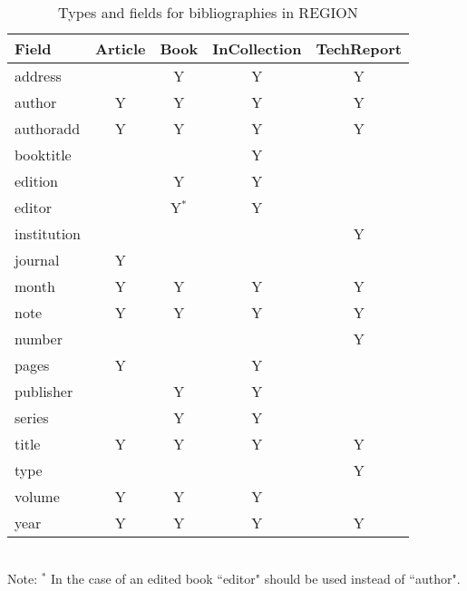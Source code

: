 \documentclass[a4paper,twoside]{article}
\begin{document}
\begin{table}
\centering
\caption{Types and fields for bibliographies in REGION}
\label{tab:6}
\begin{tabular}{||l|c|c|c|c||}
\hline
  {\bf Field} \hspace{13mm} & \hspace{5mm} {\bf Article} \hspace{5mm} & \hspace{5mm} {\bf Book} \hspace{5mm} & {\bf InCollection} & {\bf TechReport}  \\ \hline
  address      &         &  Y   &    Y         &   Y         \\ \hline
  author       &    Y    &  Y   &    Y         &   Y         \\ \hline
  authoradd    &    Y    &  Y   &    Y         &   Y         \\ \hline 
  booktitle    &         &      &    Y         &             \\ \hline
  edition      &         &  Y   &    Y         &             \\ \hline	
  editor       &         &  Y$^*$   &    Y         &             \\ \hline
  institution  &         &      &              &   Y         \\ \hline
  journal      &    Y    &      &              &             \\ \hline
  month        &    Y    &  Y   &    Y         &   Y         \\ \hline
  note         &    Y    &  Y   &    Y         &   Y         \\ \hline
  number       &         &      &              &   Y         \\ \hline	
  pages        &    Y    &      &    Y         &             \\ \hline
  publisher    &         &  Y   &    Y         &             \\ \hline	
  series       &         &  Y   &    Y         &             \\ \hline
  title        &    Y    &  Y   &    Y         &   Y         \\ \hline
  type         &         &      &              &   Y         \\ \hline
  volume       &    Y    &  Y   &    Y         &             \\ \hline
  year         &    Y    &  Y   &    Y         &   Y         \\ \hline
\end{tabular}
{\\[3mm]Note: $^*$ In the case of an edited book ``editor" should be used instead of ``author".}
\end{table}
\end{document}
